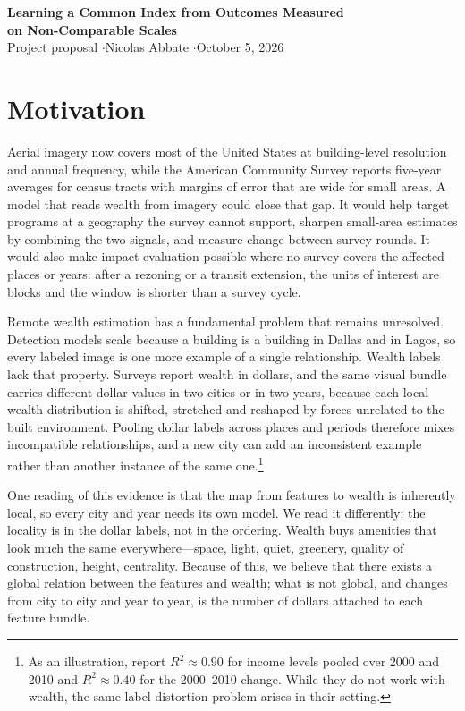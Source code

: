\documentclass[11pt]{article}
\theoremstyle{tight}
\begin{document}
\begin{center}
{\Large\bfseries Learning a Common Index from Outcomes Measured\\[0.15em] on Non-Comparable Scales}\\[0.5em]
Project proposal \quad$\cdot$\quad Nicolas Abbate \quad$\cdot$\quad October 5, 2026
\end{center}
\vspace{-0.6em}

\section{Motivation}

Aerial imagery now covers most of the United States at building-level resolution and annual
frequency, while the American Community Survey reports five-year averages for census tracts
with margins of error that are wide for small areas. A model that reads wealth from imagery
could close that gap. It would help target programs at a geography the survey cannot support,
sharpen small-area estimates by combining the two signals, and measure change between survey
rounds. It would also make impact evaluation possible where no survey covers the affected
places or years: after a rezoning or a transit extension, the units of interest are blocks and
the window is shorter than a survey cycle.

Remote wealth estimation has a fundamental problem that remains unresolved. Detection
models scale because a building is a building in Dallas and in Lagos, so every labeled image
is one more example of a single relationship. Wealth labels lack that property. Surveys report
wealth in dollars, and the same visual bundle carries different dollar values in two cities or
in two years, because each local wealth distribution is shifted, stretched and reshaped by
forces unrelated to the built environment. Pooling dollar labels across places and periods
therefore mixes incompatible relationships, and a new city can add an inconsistent example
rather than another instance of the same one.\footnote{As an illustration, \citet{khachiyan2022} report $R^2\approx 0.90$
for income levels pooled over 2000 and 2010 and $R^2\approx 0.40$ for the 2000--2010 change. While they do not work with wealth, 
the same label distortion problem arises in their setting.}

One reading of this evidence is that the map from features to wealth is inherently local, so
every city and year needs its own model. We read it differently: the locality is in the dollar
labels, not in the ordering. Wealth buys amenities that look much the same everywhere---space,
light, quiet, greenery, quality of construction, height, centrality. Because of this, we believe 
that there exists a global relation between the features and wealth; what is not global, and changes
from city to city and year to year, is the number of dollars attached to each feature bundle.
\end{document}
